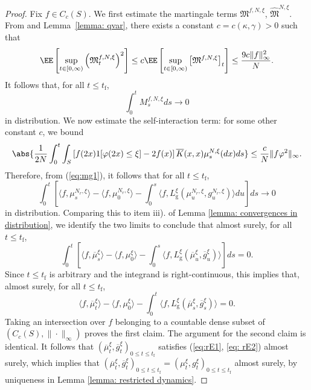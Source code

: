 \begin{proof}
Fix $f\in C_c(S)$. We first estimate the martingale terms $\mathfrak{M}^{f,N,\xi}$,  $\widehat{\mathfrak{M}}^{N,\xi}$. From \cite[Thrm. 26.12]{K02} and Lemma~\ref{lemma: qvar}, there exists a  constant $c=c(\kappa,\gamma)>0$ such that
\begin{equation*}
    \EE\left[\sup_{t\in[0,\infty)} \left(\mathfrak{M}_t^{f,N,\xi}\right)^2\right]
    \leq c \EE\left[\sup_{t\in[0,\infty)} \left[\mathfrak{M}^{f,N,\xi}\right]_t\right]
    \leq \frac{9c \|f\|_\infty^2}{N}.
\end{equation*} It follows that, for all $t\le t_\mathrm{f}$,\begin{equation} \int_0^{t} M^{f,N,\xi}_s d s \rightarrow 0\end{equation} in distribution.
We now estimate the self-interaction term: for some other constant $c$, we bound
\begin{equation*}
   \abs{\frac{1}{2N}\int_0^t \int_S \left[f(2x)1[\varphi(2x)\leq \xi] - 2f(x)\right]\overline{K}(x,x)\mu^{N,\xi}_s(d x) d s}
   \leq \frac{c}{N}\|f\varphi^2\|_\infty.
\end{equation*}
Therefore, from (\ref{eq:mg1}), it follows that for all $t \le t_\mathrm{f}$, \begin{equation} \int_0^t\left[\langle f,\mu^{N_r, \xi}_{s}\rangle -\langle f, \mu^{N_r,\xi}_0\rangle -\int_0^{s} \langle f, L^\xi_\mathrm{g}(\mu^{N_r,\xi}_u, g^{N_r,\xi}_u)\rangle du \right]ds\rightarrow 0 \end{equation} in distribution. Comparing this to item iii). of Lemma \ref{lemma: convergences in distribution}, we identify the two limits to conclude that almost surely, for all $t\le t_\mathrm{f}$, \begin{equation} \int_0^t\left[\langle f, \overline{\mu}^{\xi}_s\rangle -\langle f, {\mu}^{\xi}_0\rangle -\int_0^s \langle f, L^\xi_\mathrm{g}(\overline{\mu}^{\xi}_u, \overline{g}^{\xi}_u)\rangle \right]ds =0.\end{equation} Since $t\le t_\mathrm{f}$ is arbitrary and the integrand is right-continuous, this implies that, almost surely, for all $t\le t_\mathrm{f}$, \begin{equation} \langle f, \overline{\mu}^{\xi}_t\rangle -\langle f, {\mu}^{\xi}_0\rangle -\int_0^t \langle f, L^\xi_\mathrm{g}(\overline{\mu}^{\xi}_s, \overline{g}^{\xi}_s)\rangle  =0.\end{equation} Taking an intersection over $f$ belonging to a countable dense subset of $(C_c(S), \|\cdot\|_\infty)$ proves the first claim. The argument for the second claim is identical. It follows that $(\overline{\mu}^\xi_t, \overline{g}^\xi_t)_{0\le t\le t_\mathrm{f}}$ satisfies (\ref{eq:rE1}, \ref{eq: rE2}) almost surely, which implies that $(\overline{\mu}^\xi_t, \overline{g}^\xi_t)_{0\le t\le t_\mathrm{f}}=(\mu^\xi_t, g^\xi_t)_{0\le t\le t_\mathrm{f}}$ almost surely, by uniqueness in Lemma \ref{lemma: restricted dynamics}.
\end{proof}

